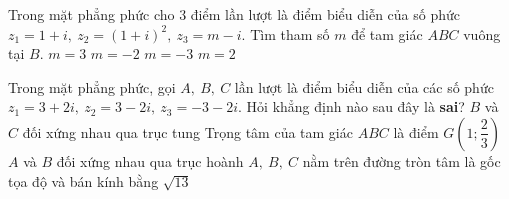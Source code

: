 \begin{ex}%
	Trong mặt phẳng phức cho $3$ điểm lần lượt là điểm biểu diễn của số phức $z_1=1+i,\:z_2=\left(1+i\right)^2,\:z_3=m-i$. Tìm tham số $m$ để tam giác $ABC$ vuông tại $B$.
	\choice
	{$m=3$}
	{$m=-2$}
	{\True $m=-3$}
	{$m=2$}
\end{ex}
\begin{ex}%
	Trong mặt phẳng phức, gọi $A,\:B,\:C$ lần lượt là điểm biểu diễn của các số phức $z_1=3+2i,\:z_2=3-2i,\:z_3=-3-2i$. Hỏi khẳng định nào sau đây là {\bf sai}?
	\choice
	{$B$ và $C$ đối xứng nhau qua trục tung}
	{\True Trọng tâm của tam giác $ABC$ là điểm $G\left(1;\dfrac{2}{3}\right)$}
	{$A$ và $B$ đối xứng nhau qua trục hoành}
	{$A,\:B,\:C$ nằm trên đường tròn tâm là gốc tọa độ và bán kính bằng $\sqrt{13}$}
\end{ex}


